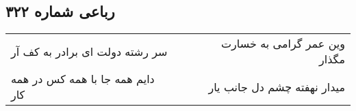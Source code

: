 \begin{center}
\section*{رباعی شماره ۳۲۲}
\label{sec:sh322}
\begin{longtable}{l p{0.5cm} r}
سر رشته دولت ای برادر به کف آر
&&
وین عمر گرامی به خسارت مگذار
\\
دایم همه جا با همه کس در همه کار
&&
میدار نهفته چشم دل جانب یار
\\
\end{longtable}
\end{center}
